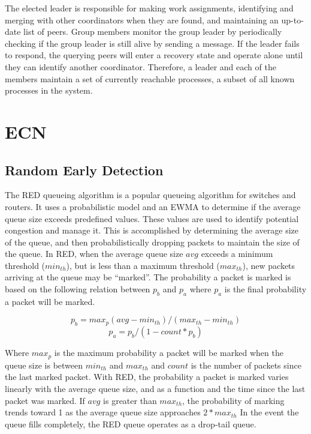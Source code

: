 The elected leader is responsible for making work assignments, identifying and merging with other coordinators when they are found, and maintaining an up-to-date list of peers.
Group members monitor the group leader by periodically checking if the group leader is still alive by sending a message.
If the leader fails to respond, the querying peers will enter a recovery state and operate alone until they can identify another coordinator.
Therefore, a leader and each of the members maintain a set of currently reachable processes, a subset of all known processes in the system.


\section{ECN}

\subsection{Random Early Detection}
The \ac{RED} queueing algorithm is a popular queueing algorithm for switches and routers.
It uses a probabilistic model and an \ac{EWMA} to determine if the average queue size exceeds predefined values.
These values are used to identify potential congestion and manage it.
This is accomplished by determining the average size of the queue, and then probabilistically dropping packets to maintain the size of the queue.
In \ac{RED}, when the average queue size $avg$ exceeds a minimum threshold ($min_{th}$), but is less than a maximum threshold ($max_{th}$), new packets arriving at the queue may be ``marked''.
The probability a packet is marked is based on the following relation between $p_{b}$ and $p_{a}$ where $p_{a}$ is the final probability a packet will be marked.

\begin{equation}
p_{b} = max_p (avg - min_{th}) / (max_{th}-min_{th})
\end{equation}
\begin{equation}
p_{a} = p_{b} / (1-count * p_b)
\end{equation}

Where $max_p$ is the maximum probability a packet will be marked when the queue size is between $min_{th}$ and $max_{th}$ and $count$ is the number of packets since the last marked packet.
With \ac{RED}, the probability a packet is marked varies linearly with the average queue size, and as a function and the time since the last packet was marked.
If $avg$ is greater than $max_{th}$, the probability of marking trends toward 1 as the average queue size approaches $2*max_{th}$
In the event the queue fills completely, the \ac{RED} queue operates as a drop-tail queue.

